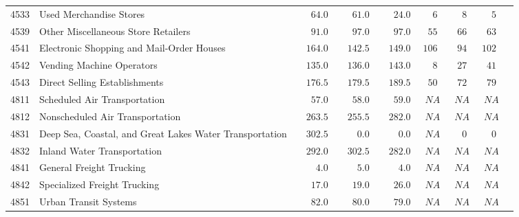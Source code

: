 \documentclass[9pt, oneside]{article}   	%
\begin{document}
\begin{longtable}{lp{3.5 in}ccccccc}
4533  & Used Merchandise Stores & $\phantom{000}64.0$ & $\phantom{000}61.0$ & $\phantom{000}24.0$ & $\phantom{00}6$ & $\phantom{00}8$ & $\phantom{00}5$ \\
4539  & Other Miscellaneous Store Retailers & $\phantom{000}91.0$ & $\phantom{000}97.0$ & $\phantom{000}97.0$ & $\phantom{0}55$ & $\phantom{0}66$ & $\phantom{0}63$ \\
4541  & Electronic Shopping and Mail-Order Houses & $\phantom{00}164.0$ & $\phantom{00}142.5$ & $\phantom{00}149.0$ & $106$ & $\phantom{0}94$ & $102$ \\
4542  & Vending Machine Operators & $\phantom{00}135.0$ & $\phantom{00}136.0$ & $\phantom{00}143.0$ & $\phantom{00}8$ & $\phantom{0}27$ & $\phantom{0}41$ \\
4543  & Direct Selling Establishments & $\phantom{00}176.5$ & $\phantom{00}179.5$ & $\phantom{00}189.5$ & $\phantom{0}50$ & $\phantom{0}72$ & $\phantom{0}79$ \\
4811  & Scheduled Air Transportation & $\phantom{000}57.0$ & $\phantom{000}58.0$ & $\phantom{000}59.0$ & $\phantom{0}NA$ & $\phantom{0}NA$ & $\phantom{0}NA$ \\
4812  & Nonscheduled Air Transportation & $\phantom{00}263.5$ & $\phantom{00}255.5$ & $\phantom{00}282.0$ & $\phantom{0}NA$ & $\phantom{0}NA$ & $\phantom{0}NA$ \\
4831  & Deep Sea, Coastal, and Great Lakes Water Transportation & $\phantom{00}302.5$ & $\phantom{0000}0.0$ & $\phantom{0000}0.0$ & $\phantom{0}NA$ & $\phantom{00}0$ & $\phantom{00}0$ \\
4832  & Inland Water Transportation & $\phantom{00}292.0$ & $\phantom{00}302.5$ & $\phantom{00}282.0$ & $\phantom{0}NA$ & $\phantom{0}NA$ & $\phantom{0}NA$ \\
4841  & General Freight Trucking & $\phantom{0000}4.0$ & $\phantom{0000}5.0$ & $\phantom{0000}4.0$ & $\phantom{0}NA$ & $\phantom{0}NA$ & $\phantom{0}NA$ \\
4842  & Specialized Freight Trucking & $\phantom{000}17.0$ & $\phantom{000}19.0$ & $\phantom{000}26.0$ & $\phantom{0}NA$ & $\phantom{0}NA$ & $\phantom{0}NA$ \\
4851  & Urban Transit Systems & $\phantom{000}82.0$ & $\phantom{000}80.0$ & $\phantom{000}79.0$ & $\phantom{0}NA$ & $\phantom{0}NA$ & $\phantom{0}NA$ \\

\end{longtable}
\end{document}
